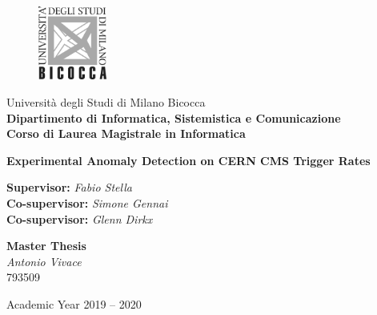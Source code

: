 
\thispagestyle{empty}
\addtocounter{page}{-1}

	\begin{figure}
		\vspace*{-8mm}
		\centering
		\includegraphics[width=0.20\textwidth]{logo-bicocca.jpg}
	\end{figure}
	\large \noindent Università degli Studi di Milano Bicocca \\
	\textbf{Dipartimento di Informatica, Sistemistica e Comunicazione \\
			Corso di Laurea Magistrale in Informatica}

\vfill


\begin{center}
	{\Huge \textbf{Experimental Anomaly Detection on CERN CMS Trigger Rates}}
\end{center}

\vfill

\begin{flushleft}
	{\Large \textbf{Supervisor:} \textit{Fabio Stella} \\
	 \textbf{Co-supervisor:} \textit{Simone Gennai} \\
	 \textbf{Co-supervisor:} \textit{Glenn Dirkx}}
\end{flushleft}

\vspace{8mm}
\par

\begin{flushright}
	{\Large \textbf{Master Thesis} \\
			\textit{Antonio Vivace} \\ 793509}
\end{flushright}

\vfill
\par

\begin{center}
	{\large Academic Year 2019 -- 2020}
\end{center}

\clearpage